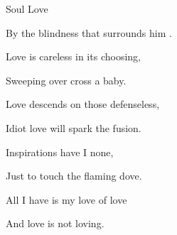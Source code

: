\begin{song}{Soul Love}{
	
	\chordset[Verse]{ \GMaj \Em \CMaj \Bm \Am \DMaj }

	\chordset[Chorus]{ \FMaj \GSeven \Cm \GMajShE \DMajShA }
	
}
\begin{songverse}
By the blindness that surrounds him .

\end{songverse}
\begin{songchorus}

Love is careless in its choosing,

Sweeping over cross a baby.

Love descends on those defenseless,

Idiot love will spark the fusion.


Inspirations have I none,

Just to touch the flaming dove.

All I have is my love of love

And love is not loving.

\end{songchorus}

\end{song}